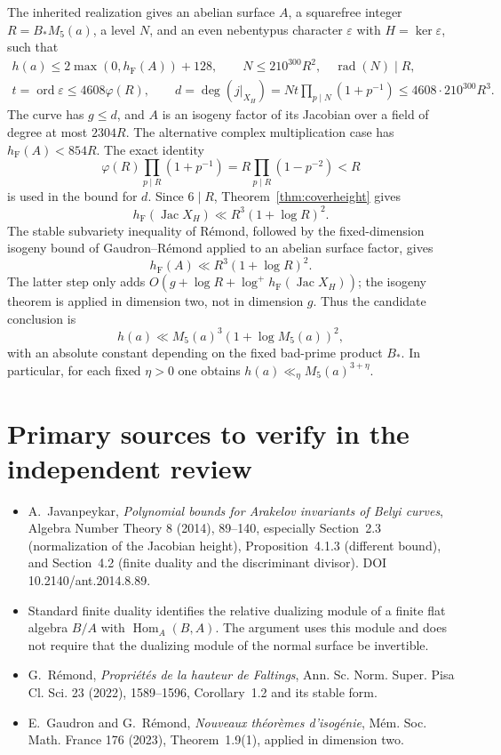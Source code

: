 \documentclass[11pt]{article}
\newcommand{\hF}{h_{\mathrm F}}
\begin{document}
The inherited realization gives an abelian surface $A$, a squarefree
integer $R=B_*M_5(a)$, a level $N$, and an even nebentypus character
$\varepsilon$ with $H=\ker\varepsilon$, such that
\[
 \begin{gathered}
 h(a)\leq2\max(0,\hF(A))+128,\qquad
 N\leq210^{300}R^2,\quad\operatorname{rad}(N)\mid R,\\
 t=\operatorname{ord}\varepsilon\leq4608\varphi(R),\qquad
 d=\deg(j|_{X_H})
   =Nt\prod_{p\mid N}(1+p^{-1})
   \leq4608\cdot210^{300}R^3.
 \end{gathered}
\]
The curve has $g\leq d$, and $A$ is an isogeny factor of its
Jacobian over a field of degree at most $2304R$. The alternative
complex multiplication case has $\hF(A)<854R$.
The exact identity
\[
 \varphi(R)\prod_{p\mid R}(1+p^{-1})
 =R\prod_{p\mid R}(1-p^{-2})<R
\]
is used in the bound for $d$. Since $6\mid R$,
Theorem~\ref{thm:coverheight} gives
\[
 \hF(\operatorname{Jac}X_H)\ll R^3(1+\log R)^2.
\]
The stable subvariety inequality of R\'emond, followed by the
fixed-dimension isogeny bound of Gaudron--R\'emond applied to an
abelian surface factor, gives
\[
 \hF(A)\ll R^3(1+\log R)^2.
\]
The latter step only adds $O(g+\log R+\log^+\hF(\operatorname{Jac}X_H))$;
the isogeny theorem is applied in dimension two, not in dimension
$g$. Thus the candidate conclusion is
\[
 h(a)\ll M_5(a)^3(1+\log M_5(a))^2,
\]
with an absolute constant depending on the fixed bad-prime product
$B_*$. In particular, for each fixed $\eta>0$ one obtains
$h(a)\ll_\eta M_5(a)^{3+\eta}$.

\section{Primary sources to verify in the independent review}
\begin{itemize}
\item A.~Javanpeykar, \emph{Polynomial bounds for Arakelov invariants
of Belyi curves}, Algebra Number Theory 8 (2014), 89--140,
especially Section~2.3 (normalization of the Jacobian height),
Proposition~4.1.3 (different bound), and Section~4.2 (finite duality
and the discriminant divisor). DOI 10.2140/ant.2014.8.89.
\item Standard finite duality identifies the relative dualizing
module of a finite flat algebra $B/A$ with
$\operatorname{Hom}_A(B,A)$. The argument uses this module and
does not require that the dualizing module of the normal surface
be invertible.
\item G.~R\'emond, \emph{Propri\'et\'es de la hauteur de Faltings},
Ann. Sc. Norm. Super. Pisa Cl. Sci. 23 (2022), 1589--1596,
Corollary~1.2 and its stable form.
\item E.~Gaudron and G.~R\'emond, \emph{Nouveaux th\'eor\`emes
d'isog\'enie}, M\'em. Soc. Math. France 176 (2023),
Theorem~1.9(1), applied in dimension two.
\end{itemize}
\end{document}
